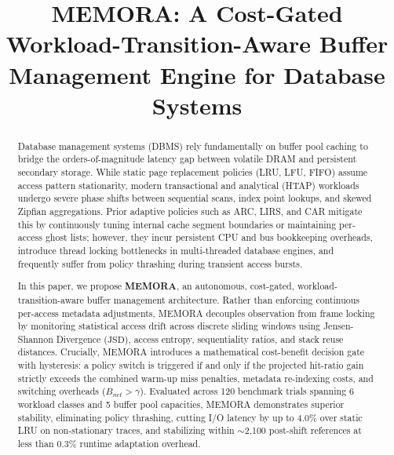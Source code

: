 \documentclass[conference]{IEEEtran}
\begin{document}
\title{MEMORA: A Cost-Gated Workload-Transition-Aware Buffer Management Engine for Database Systems}

\author{
}

\maketitle

\begin{abstract}
Database management systems (DBMS) rely fundamentally on buffer pool caching to bridge the orders-of-magnitude latency gap between volatile DRAM and persistent secondary storage. While static page replacement policies (LRU, LFU, FIFO) assume access pattern stationarity, modern transactional and analytical (HTAP) workloads undergo severe phase shifts between sequential scans, index point lookups, and skewed Zipfian aggregations. Prior adaptive policies such as ARC, LIRS, and CAR mitigate this by continuously tuning internal cache segment boundaries or maintaining per-access ghost lists; however, they incur persistent CPU and bus bookkeeping overheads, introduce thread locking bottlenecks in multi-threaded database engines, and frequently suffer from policy thrashing during transient access bursts.

In this paper, we propose \textbf{MEMORA}, an autonomous, cost-gated, workload-transition-aware buffer management architecture. Rather than enforcing continuous per-access metadata adjustments, MEMORA decouples observation from frame locking by monitoring statistical access drift across discrete sliding windows using Jensen-Shannon Divergence ($\text{JSD}$), access entropy, sequentiality ratios, and stack reuse distances. Crucially, MEMORA introduces a mathematical cost-benefit decision gate with hysteresis: a policy switch is triggered if and only if the projected hit-ratio gain strictly exceeds the combined warm-up miss penalties, metadata re-indexing costs, and switching overheads ($B_{net} > \gamma$). Evaluated across 120 benchmark trials spanning 6 workload classes and 5 buffer pool capacities, MEMORA demonstrates superior stability, eliminating policy thrashing, cutting I/O latency by up to 4.0\% over static LRU on non-stationary traces, and stabilizing within $\sim$2,100 post-shift references at less than 0.3\% runtime adaptation overhead.
\end{abstract}
\end{document}
